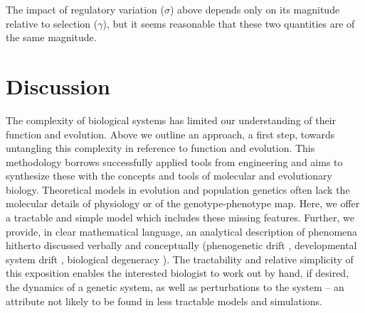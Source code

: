 \documentclass{article}
\newcommand{\1}{\mathbbm{1}}
\begin{document}
The impact of regulatory variation ($\sigma$) above
depends only on its magnitude relative to selection ($\gamma$),
but it seems reasonable that these two quantities are of the same magnitude.


\section*{Discussion}


The complexity of biological systems has limited our understanding of their function and evolution. Above we outline an approach, a first step, towards untangling this complexity in reference to function and evolution. This methodology borrows successfully applied tools from engineering and aims to synthesize these with the concepts and tools of molecular and evolutionary biology.
Theoretical models in evolution and population genetics often lack the molecular details of physiology or of the genotype-phenotype map. 
Here, we offer a tractable and simple model which includes these missing features. 
Further, we provide, in clear mathematical language, an analytical description of phenomena hitherto discussed verbally and conceptually 
(phenogenetic drift \citep{weiss2000phenogenetic}, developmental system drift \citep{true2001developmental}, biological degeneracy \citep{edelman2001degeneracy}). 
The tractability and relative simplicity of this exposition enables the interested biologist to work out by hand, 
if desired, 
the dynamics of a genetic system, as well as perturbations to the system -- an attribute not likely to be found in less tractable models and simulations.
\end{document}
